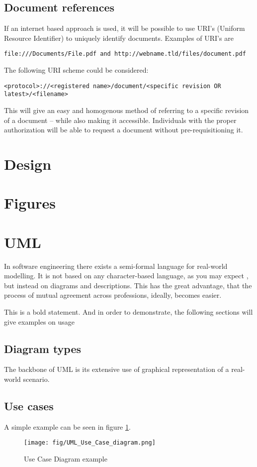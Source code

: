 \documentclass[10pt,a4paper]{article}
\begin{document}
\subsection{Document references}
If an internet based approach is used, it will be possible to use URI's (Uniform Resource Identifier) to uniquely identify documents. Examples of URI's are 
\begin{verbatim}
file:///Documents/File.pdf and http://webname.tld/files/document.pdf
\end{verbatim}
The following URI scheme could be considered: 
\begin{verbatim}
<protocol>://<registered name>/document/<specific revision OR latest>/<filename>
\end{verbatim}

This will give an easy and homogenous method of referring to a specific revision of a document – while also making it accessible. Individuals with the proper authorization will be able to request a document without pre-requisitioning it.


\section{Design}



\appendix
\section{Figures}
\listoffigures

\section{UML}
In software engineering there exists a semi-formal language for real-world modelling. It is not based on any character-based language, as you may expect , but instead on diagrams and descriptions. This has the great advantage, that the process of mutual agreement across professions, ideally, becomes easier.

This is a bold statement. And in order to demonstrate, the following sections will give examples on usage
\subsection{Diagram types}
The backbone of UML is its extensive use of graphical representation of a real-world scenario. 

\subsection{Use cases}
A simple example can be seen in figure \ref{fig:use_case_diagram_example}.
\begin{figure}[h]
\centering
\texttt{[image: fig/UML\_Use\_Case\_diagram.png]} 
\caption{Use Case Diagram example}
\label{fig:use_case_diagram_example}
\end{figure}
\end{document}
